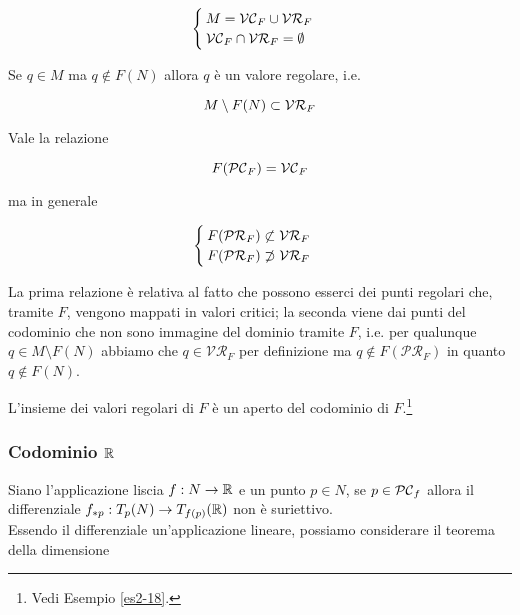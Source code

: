 \begin{equation}
	\begin{cases}
		M = \mathcal{VC}_{F} \cup \mathcal{VR}_{F}\\
		\mathcal{VC}_{F} \cap \mathcal{VR}_{F} = \emptyset
	\end{cases}
\end{equation}

\begin{remark}
	Se $ q \in M $ ma $ q \notin F(N) $ allora $ q $ è un valore regolare, i.e.
	
	\begin{equation}
		M \setminus F(N) \subset \mathcal{VR}_{F}
	\end{equation}
\end{remark}

\begin{remark}
	Vale la relazione
	
	\begin{equation}
		F(\mathcal{PC}_{F}) = \mathcal{VC}_{F}
	\end{equation}

	ma in generale
	
	\begin{equation}
		\begin{cases}
			F(\mathcal{PR}_{F}) \not\subset \mathcal{VR}_{F}\\
			F(\mathcal{PR}_{F}) \not\supset \mathcal{VR}_{F}
		\end{cases}
	\end{equation}

	La prima relazione è relativa al fatto che possono esserci dei punti regolari che, tramite $ F $, vengono mappati in valori critici; la seconda viene dai punti del codominio che non sono immagine del dominio tramite $ F $, i.e. per qualunque $ q \in M \setminus F(N) $ abbiamo che $ q \in \mathcal{VR}_{F} $ per definizione ma $ q \notin F(\mathcal{PR}_{F}) $ in quanto $ q \notin F(N) $.
\end{remark}

\begin{remark}
	L'insieme dei valori regolari di $ F $ è un aperto del codominio di $ F $.\footnote{%
		Vedi Esempio \ref{es2-18}.%
	}
\end{remark}

\subsubsection{Codominio $ \mathbb{R} $}

Siano l'applicazione liscia $ f : N \to \mathbb{R} $ e un punto $ p \in N $, se $ p \in \mathcal{PC}_{f} $ allora il differenziale $ f_{*p} : T_{p}(N) \to T_{f(p)}(\mathbb{R}) $ non è suriettivo.\\
Essendo il differenziale un'applicazione lineare, possiamo considerare il teorema della dimensione


